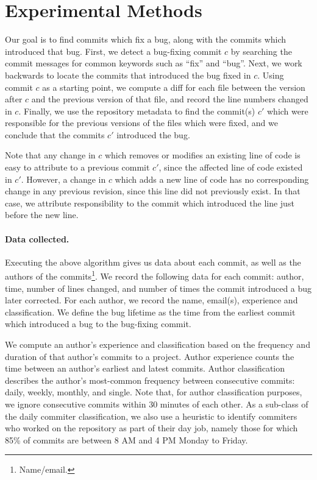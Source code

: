 \section{Experimental Methods}
\label{sec:method}
Our goal is to find commits which fix a bug, along with the commits
which introduced that bug. First, we detect a bug-fixing commit $c$ by
searching the commit messages for common keywords such as ``fix'' and
``bug''. Next, we work backwards to locate the commits that introduced
the bug fixed in $c$. Using commit $c$ as a starting point, we compute
a diff for each file between the version after $c$ and the previous
version of that file, and record the line numbers changed in
$c$. Finally, we use the repository metadata to find the commit(s)
$c'$ which were responsible for the previous versions of the files
which were fixed, and we conclude that the commits $c'$ introduced the
bug.

Note that any change in $c$ which removes or modifies an existing line
of code is easy to attribute to a previous commit $c'$, since the
affected line of code existed in $c'$. However, a change in $c$ which
adds a new line of code has no corresponding change in any previous
revision, since this line did not previously exist. In that case, we
attribute responsibility to the commit which introduced the line just
before the new line.

\paragraph{Data collected.}
Executing the above algorithm gives us data about each commit, as well
as the authors of the commits\footnote{Name/email.}.  We record the
following data for each commit: author, time, number of lines changed,
and number of times the commit introduced a bug later corrected. For
each author, we record the name, email(s), experience and
classification. We define the bug lifetime as the time from the
earliest commit which introduced a bug to the bug-fixing commit.

We compute an author's experience and classification based on the
frequency and duration of that author's commits to a project. Author
experience counts the time between an author's earliest and latest
commits. Author classification describes the author's most-common
frequency between consecutive commits: daily, weekly, monthly, and
single. Note that, for author classification purposes, we ignore
consecutive commits within 30 minutes of each other. As a sub-class of
the daily commiter classification, we also use a heuristic to identify
commiters who worked on the repository as part of their day job,
namely those for which 85\% of commits are between 8 AM and 4 PM
Monday to Friday.

